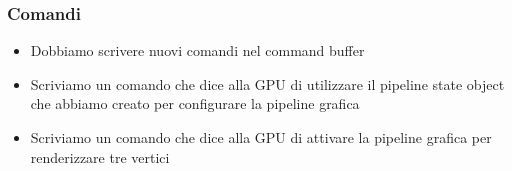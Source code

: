 \begin{frame}
\frametitle{Comandi}

\begin{itemize}
\item Dobbiamo scrivere nuovi comandi nel command buffer
\item Scriviamo un comando che dice alla GPU di utilizzare il pipeline state object che abbiamo creato per configurare la pipeline grafica
\item Scriviamo un comando che dice alla GPU di attivare la pipeline grafica per renderizzare tre vertici
\end{itemize}

\end{frame}
